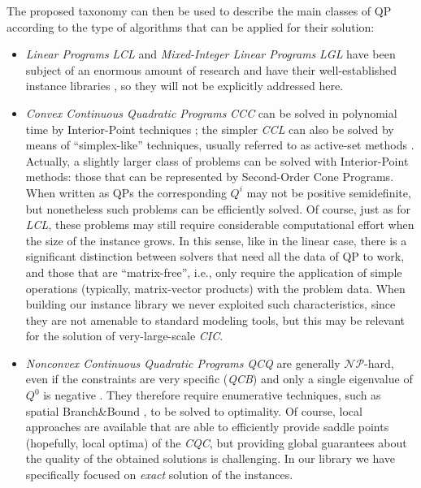 The proposed taxonomy can then be used to describe the main classes of QP according to the type of algorithms that can be applied for their solution:
%
\begin{itemize}
 \item \emph{Linear Programs} \textit{LCL} and \emph{Mixed-Integer Linear Programs} \textit{LGL} have been subject of an enormous amount of research and have their well-established instance libraries \cite{Koch2011}, so they will not be explicitly addressed here.
 \item \emph{Convex Continuous Quadratic Programs} \textit{CCC} can be solved in polynomial time by Interior-Point techniques \cite{Wright97}; the simpler \textit{CCL} can also be solved by means of ``simplex-like'' techniques, usually referred to as active-set methods \cite{Dost09}. Actually, a slightly larger class of problems can be solved with Interior-Point methods: those that can be represented by Second-Order Cone Programs. When written as QPs the corresponding $Q^i$ may not be positive semidefinite, but nonetheless such problems can be efficiently solved. Of course, just as for \textit{LCL}, these problems may still require considerable computational effort when the size of the instance grows. In this sense, like in the linear case, there is a significant distinction between solvers that need all the data of QP to work, and those that are ``matrix-free'', i.e., only require the application of simple operations (typically, matrix-vector products) with the problem data. When building our instance library we never exploited such characteristics, since they are not amenable to standard modeling tools, but this may be relevant for the solution of very-large-scale \textit{CIC}.
 \item \emph{Nonconvex Continuous Quadratic Programs} \textit{QCQ} are generally $\mathcal{NP}$-hard, even if the constraints are very specific (\textit{QCB}) and only a single eigenvalue of $Q^0$ is negative \cite{Hemmecke2010}. They therefore require enumerative techniques, such as spatial Branch\&Bound \cite{FV90,BeLeLiMaWa08}, to be solved to optimality. Of course, local approaches are available that are able to efficiently provide saddle points (hopefully, local optima) of the \textit{CQC}, but providing global guarantees about the quality of the obtained solutions is challenging. In our library we have specifically focused on  \emph{exact} solution of the instances.

\end{itemize}
